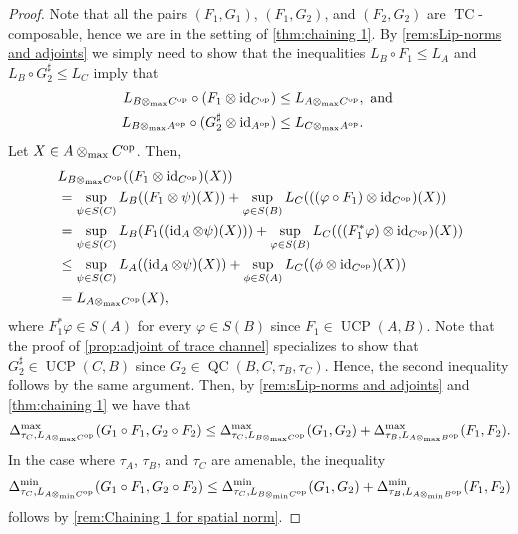 \documentclass[11pt, a4paper, oneside, final, reqno]{amsart}
\newcommand{\UCP}{\operatorname{UCP}}
\newcommand{\QC}{\operatorname{QC}}
\newcommand{\TC}{\operatorname{TC}}
\newcommand{\id}{\operatorname{id}}
\theoremstyle{definition}
\theoremstyle{plain}
\theoremstyle{remark}
\numberwithin{equation}{section}
\begin{document}
\begin{proof}
    Note that all the pairs $(F_1,G_1)$, $(F_1,G_2)$, and $(F_2,G_2)$ are $\TC$-composable, hence we are in the setting of \cref{thm:chaining 1}. By \cref{rem:sLip-norms and adjoints} we simply need to show that the inequalities $L_B \circ F_1 \leq L_A$ and $L_B \circ G_2^\sharp \leq L_C$ imply that
    \begin{align*}
        L_{B \otimes_{\rm max} C^{\rm op}} \circ (F_1 \otimes \id_{C^{\rm op}}) & \leq L_{A \otimes_{\rm max} C^{\rm op}}, \text{ and } \\
        L_{B \otimes_{\rm max} A^{\rm op}} \circ (G_2^\sharp \otimes \id_{A^{\rm op}}) & \leq L_{C \otimes_{\rm max} A^{\rm op}}.
    \end{align*}
    Let $X \in A \otimes_{\rm max} C^{\rm op}$. Then,
    \begin{align*}
        & L_{B \otimes_{\rm max} C^{\rm op}}((F_1 \otimes \id_{C^{\rm op}})(X)) \\
        & = \sup\limits_{\psi \in S(C)}L_B((F_1 \otimes \psi)(X)) + \sup\limits_{\varphi \in S(B)}L_C(((\varphi \circ F_1) \otimes \id_{C^{\rm op}})(X)) \\
        & = \sup\limits_{\psi \in S(C)}L_B(F_1((\id_A \otimes \psi)(X))) + \sup\limits_{\varphi \in S(B)}L_C(((F_1^*\varphi) \otimes \id_{C^{\rm op}})(X)) \\
        & \leq \sup\limits_{\psi \in S(C)}L_A((\id_A \otimes \psi)(X)) + \sup\limits_{\phi \in S(A)}L_C((\phi \otimes \id_{C^{\rm op}})(X)) \\
        & = L_{A \otimes_{\rm max} C^{\rm op}}(X),
    \end{align*}
    where $F_1^*\varphi \in S(A)$ for every $\varphi \in S(B)$ since $F_1 \in \UCP(A,B)$. Note that the proof of \cref{prop:adjoint of trace channel} specializes to show that $G_2^\sharp \in \UCP(C,B)$ since $G_2 \in \QC(B,C,\tau_B, \tau_C)$. Hence, the second inequality follows by the same argument. Then, by \cref{rem:sLip-norms and adjoints} and \cref{thm:chaining 1} we have that
    \begin{equation*}
        \Delta_{\tau_C,L_{A \otimes_{\rm max} C^{\rm op}}}^{\rm max}(G_1 \circ F_1, G_2 \circ F_2)
        \leq \Delta_{\tau_C,L_{B \otimes_{\rm max} C^{\rm op}}}^{\rm max}(G_1, G_2) + \Delta_{\tau_B,L_{A \otimes_{\rm max} B^{\rm op}}}^{\rm max}(F_1, F_2).
    \end{equation*}
    In the case where $\tau_A$, $\tau_B$, and $\tau_C$ are amenable, the inequality
    \begin{equation*}
        \Delta_{\tau_C,L_{A \otimes_{\rm min} C^{\rm op}}}^{\rm min}(G_1 \circ F_1, G_2 \circ F_2)
        \leq \Delta_{\tau_C,L_{B \otimes_{\rm min} C^{\rm op}}}^{\rm min}(G_1, G_2) + \Delta_{\tau_B,L_{A \otimes_{\rm min} B^{\rm op}}}^{\rm min}(F_1, F_2)
    \end{equation*}
    follows by \cref{rem:Chaining 1 for spatial norm}.
\end{proof}
\end{document}
